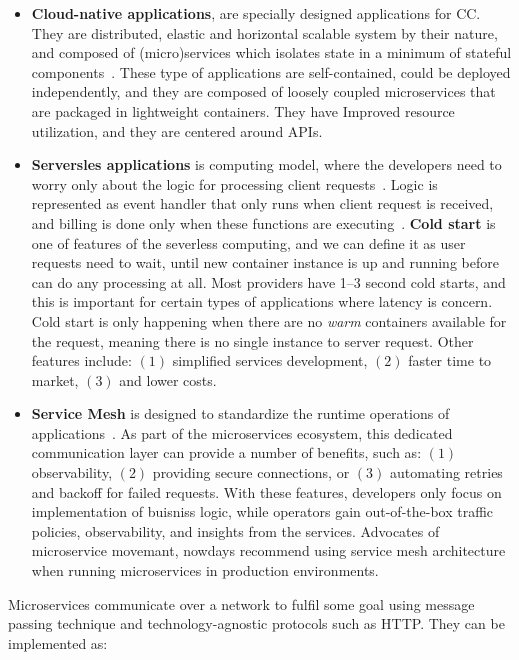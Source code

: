 \begin{itemize}
	\item \textbf{Cloud-native applications}, are specially designed applications for CC. They are distributed, elastic and horizontal scalable system by their nature, and composed of (micro)services which isolates state in a minimum of stateful components~\cite{KratzkeQ17}. These type of applications are self-contained, could be deployed independently, and they are composed of loosely coupled microservices that are packaged in lightweight containers. They have Improved resource utilization, and they are centered around APIs.
	\item \textbf{Serversles applications} is computing model, where the developers need to worry only about the logic for processing client requests~\cite{AdzicC17}. Logic is represented as event handler that only runs when client request is received, and billing is done only when these functions are executing~\cite{AdzicC17}. \textbf{Cold start} is one of features of the severless computing, and we can define it as user requests need to wait, until new container instance is up and running before can do any processing at all. Most providers have 1–3 second cold starts, and this is important for certain types of applications where latency is concern. Cold start is only happening when there are no \textit{warm} containers available for the request, meaning there is no single instance to server request. Other features include: $(1)$ simplified services development, $(2)$ faster time to market, $(3)$ and lower costs.
	\item \textbf{Service Mesh} is designed to standardize the runtime operations of applications~\cite{LiLGZH19}. As part of the microservices ecosystem,
	this dedicated communication layer can provide a number of benefits, such as: $(1)$ observability, $(2)$ providing secure connections, or $(3)$ automating retries and backoff for failed requests. With these features, developers only focus on implementation of buisniss logic, while operators gain out-of-the-box traffic policies, observability, and insights from the services. Advocates of microservice movemant, nowdays recommend using service mesh architecture when running microservices in production environments.
\end{itemize}

Microservices communicate over a network to fulfil some goal using message passing technique and technology-agnostic protocols such as HTTP. They can be implemented as:

